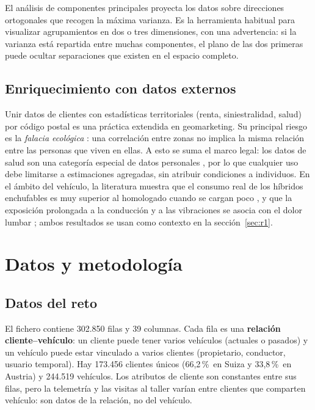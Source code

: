 \documentclass[11pt,a4paper]{article}
\newcommand{\pct}{\,\%}
\begin{document}
El análisis de componentes principales \parencite{pearson1901,jolliffe2016} proyecta los datos sobre direcciones
ortogonales que recogen la máxima varianza. Es la herramienta habitual para visualizar agrupamientos en dos o tres
dimensiones, con una advertencia: si la varianza está repartida entre muchas componentes, el plano de las dos primeras
puede ocultar separaciones que existen en el espacio completo.

\subsection{Enriquecimiento con datos externos}

Unir datos de clientes con estadísticas territoriales (renta, siniestralidad, salud) por código postal es una práctica
extendida en geomarketing. Su principal riesgo es la \emph{falacia ecológica} \parencite{robinson1950}: una correlación
entre zonas no implica la misma relación entre las personas que viven en ellas. A esto se suma el marco legal: los
datos de salud son una categoría especial de datos personales \parencite{rgpd2016}, por lo que cualquier uso debe
limitarse a estimaciones agregadas, sin atribuir condiciones a individuos. En el ámbito del vehículo, la literatura
muestra que el consumo real de los híbridos enchufables es muy superior al homologado cuando se cargan poco
\parencite{plotz2021}, y que la exposición prolongada a la conducción y a las vibraciones se asocia con el dolor lumbar
\parencite{bovenzi1999}; ambos resultados se usan como contexto en la sección~\ref{sec:r1}.

\section{Datos y metodología}\label{sec:metodo}

\subsection{Datos del reto}

El fichero contiene 302.850 filas y 39 columnas. Cada fila es una \textbf{relación cliente--vehículo}: un cliente puede
tener varios vehículos (actuales o pasados) y un vehículo puede estar vinculado a varios clientes (propietario,
conductor, usuario temporal). Hay 173.456 clientes únicos (66,2\pct\ en Suiza y 33,8\pct\ en Austria) y 244.519
vehículos. Los atributos de cliente son constantes entre sus filas, pero la telemetría y las visitas al taller varían
entre clientes que comparten vehículo: son datos de la relación, no del vehículo.
\end{document}
